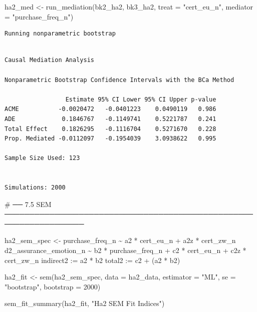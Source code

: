 \documentclass[
  letterpaper,
  DIV=11,
  numbers=noendperiod]{scrartcl}
\newenvironment{Shaded}{\begin{snugshade}}{\end{snugshade}}
\newcommand{\AttributeTok}[1]{\textcolor[rgb]{0.40,0.45,0.13}{#1}}
\newcommand{\CommentTok}[1]{\textcolor[rgb]{0.37,0.37,0.37}{#1}}
\newcommand{\DecValTok}[1]{\textcolor[rgb]{0.68,0.00,0.00}{#1}}
\newcommand{\FunctionTok}[1]{\textcolor[rgb]{0.28,0.35,0.67}{#1}}
\newcommand{\NormalTok}[1]{\textcolor[rgb]{0.00,0.23,0.31}{#1}}
\newcommand{\OtherTok}[1]{\textcolor[rgb]{0.00,0.23,0.31}{#1}}
\newcommand{\StringTok}[1]{\textcolor[rgb]{0.13,0.47,0.30}{#1}}
\begin{document}
\begin{Shaded}
\begin{Highlighting}[]
\NormalTok{ha2\_med }\OtherTok{\textless{}{-}} \FunctionTok{run\_mediation}\NormalTok{(bk2\_ha2, bk3\_ha2,}
                          \AttributeTok{treat    =} \StringTok{"cert\_eu\_n"}\NormalTok{,}
                          \AttributeTok{mediator =} \StringTok{"purchase\_freq\_n"}\NormalTok{)}
\end{Highlighting}
\end{Shaded}

\begin{verbatim}
Running nonparametric bootstrap
\end{verbatim}

\begin{verbatim}

Causal Mediation Analysis 

Nonparametric Bootstrap Confidence Intervals with the BCa Method

                 Estimate 95% CI Lower 95% CI Upper p-value
ACME           -0.0020472   -0.0401223    0.0490119   0.986
ADE             0.1846767   -0.1149741    0.5221787   0.241
Total Effect    0.1826295   -0.1116704    0.5271670   0.228
Prop. Mediated -0.0112097   -0.1954039    3.0938622   0.995

Sample Size Used: 123 


Simulations: 2000 
\end{verbatim}

\begin{Shaded}
\begin{Highlighting}[]
\CommentTok{\# ── 7.5  SEM ──────────────────────────────────────────────────────────────────}

\NormalTok{ha2\_sem\_spec }\OtherTok{\textless{}{-}} \StringTok{\textquotesingle{}}
\StringTok{  purchase\_freq\_n         \textasciitilde{} a2 * cert\_eu\_n + a2z * cert\_zw\_n}
\StringTok{  d2\_assurance\_emotion\_n  \textasciitilde{} b2 * purchase\_freq\_n +}
\StringTok{                             c2 * cert\_eu\_n + c2z * cert\_zw\_n}
\StringTok{  indirect2 := a2 * b2}
\StringTok{  total2    := c2 + (a2 * b2)}
\StringTok{\textquotesingle{}}

\NormalTok{ha2\_fit }\OtherTok{\textless{}{-}} \FunctionTok{sem}\NormalTok{(ha2\_sem\_spec, }\AttributeTok{data =}\NormalTok{ ha2\_data,}
               \AttributeTok{estimator =} \StringTok{"ML"}\NormalTok{, }\AttributeTok{se =} \StringTok{"bootstrap"}\NormalTok{, }\AttributeTok{bootstrap =} \DecValTok{2000}\NormalTok{)}

\FunctionTok{sem\_fit\_summary}\NormalTok{(ha2\_fit, }\StringTok{"Ha2 SEM Fit Indices"}\NormalTok{)}
\end{Highlighting}
\end{Shaded}
\end{document}
